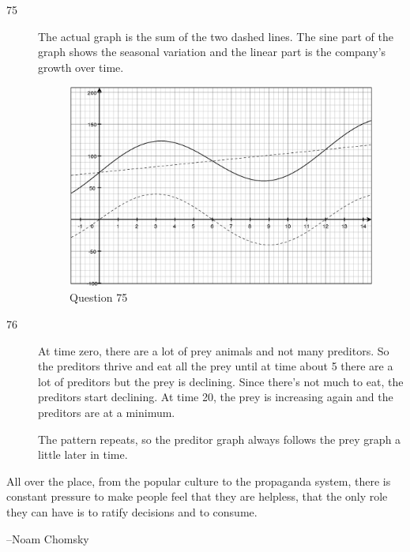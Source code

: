 \documentclass[fleqn,addpoints]{exam}
\begin{document}
\begin{description}
\item[75]

The actual graph is the sum of the two dashed lines.  The sine part of the graph shows the seasonal variation and the
linear part is the company's growth over time.

\begin{figure}[H]
  \centering
  \includegraphics[scale=.3]{question_4.6_75.eps}
  \caption*{Question 75}
\end{figure}

\item[76]

At time zero, there are a lot of prey animals and not many preditors.  So the preditors thrive and eat all the prey
until at time about 5 there are a lot of preditors but the prey is declining.  Since there's not much to eat, the
preditors start declining.  At time 20, the prey is increasing again and the preditors are at a minimum.

The pattern repeats, so the preditor graph always follows the prey graph a little later in time.

\end{description}
\else

\vspace{1 in}

\begin{em}
  All over the place, from the popular culture to the propaganda system, there is constant pressure to make people feel
  that they are helpless, that the only role they can have is to ratify decisions and to consume.
\end{em}

\vspace{.2 cm}
\hspace{1.5 cm} --Noam Chomsky

\fi
\end{document}
